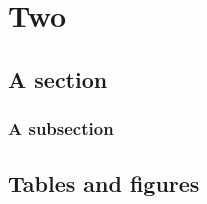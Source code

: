 \chapter{Two}
\section{A section}
\lipsum \cite{Chomsky1986,Chomsky1995,Munn2005}
\subsection{A subsection}
\lipsum



\begin{appendix}
\chapter{Tables and figures}
\end{appendix}
